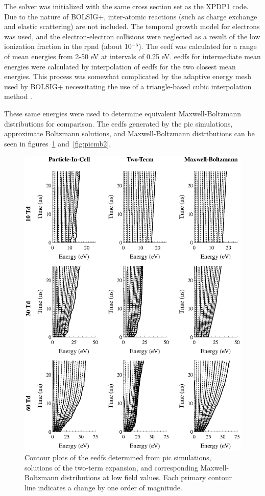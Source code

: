The solver was initialized with the same cross section set as the XPDP1 code.
Due to the nature of BOLSIG+, inter-atomic reactions (such as charge exchange
and elastic scattering) are not included. The temporal growth model for
electrons was used, and the electron-electron collisions were neglected as a
result of the low ionization fraction in the \acs{rpnd} (about 10$^{-5}$). The
\acs{eedf} was calculated for a range of mean energies from 2-50 eV at intervals
of 0.25 eV. \acs{eedf}s for intermediate mean energies were calculated by
interpolation of \acs{eedf}s for the two closest mean energies. This process was
somewhat complicated by the adaptive energy mesh used by BOLSIG+ necessitating
the use of a triangle-based cubic interpolation method \cite{Jones2001}.

These same energies were used to determine equivalent Maxwell-Boltzmann
distributions for comparison. The \acs{eedf}s generated by the \acs{pic}
simulations, approximate Boltzmann solutions, and Maxwell-Boltzmann
distributions can be seen in figures~\ref{fig:picmb1} and~\ref{fig:picmb2},
\begin{figure}
  \centering
  \includegraphics{./chapters/modeling/figures/picmb1.eps}
  \caption{Contour plots of the \acs{eedf}s determined from \acs{pic}
    simulations, solutions of the two-term expansion, and corresponding
    Maxwell-Boltzmann distributions at low field values. Each primary contour
    line indicates a change by one order of magnitude.}
  \label{fig:picmb1}
\end{figure}
